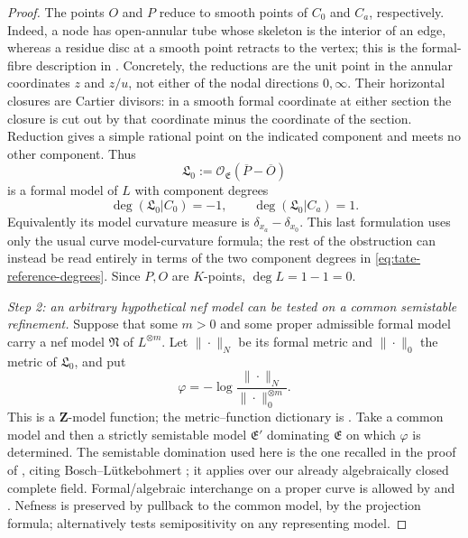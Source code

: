 \begin{proof}
The points $O$ and $P$ reduce to smooth points of $C_0$ and
$C_a$, respectively. Indeed, a node has open-annular tube whose
skeleton is the interior of an edge, whereas a residue disc at a smooth
point retracts to the vertex; this is the formal-fibre description in
\cite[Section 1.3 and Proposition 4.10]{BPR14}. Concretely, the reductions
are the unit point in the annular coordinates $z$ and $z/u$, not
either of the nodal directions $0,\infty$.
Their horizontal closures are Cartier divisors: in a smooth formal
coordinate at either section the closure is cut out by that coordinate
minus the coordinate of the section. Reduction gives a simple
rational point on the indicated component and meets no other component.
Thus
\[
 \mathfrak L_0
   :=\mathcal O_{\mathfrak E}(\overline P-\overline O)
\]
is a formal model of $L$ with component degrees
\begin{equation}
\label{eq:tate-reference-degrees}
 \deg(\mathfrak L_0|C_0)=-1,
 \qquad \deg(\mathfrak L_0|C_a)=1.
\end{equation}
Equivalently its model curvature measure is
$\delta_{x_a}-\delta_{x_0}$.
This last formulation uses only the usual curve model-curvature
formula; the rest of the obstruction can instead be read entirely in
terms of the two component degrees in
\eqref{eq:tate-reference-degrees}.
Since $P,O$ are $K$-points, $\deg L=1-1=0$.

\emph{Step 2: an arbitrary hypothetical nef model can be tested on a
common semistable refinement.}
Suppose that some $m>0$ and some proper admissible formal model
carry a nef model $\mathfrak N$ of $L^{\otimes m}$.
Let $\|\cdot\|_N$ be its formal metric and
$\|\cdot\|_0$ the metric of $\mathfrak L_0$, and put
\[
 \varphi=-\log\frac{\|\cdot\|_N}{\|\cdot\|_0^{\otimes m}}.
\]
This is a $\mathbf Z$-model function; the metric--function dictionary
is \cite[Section 4.7]{GM19}. Take a common model and then a strictly
semistable model $\mathfrak E'$ dominating $\mathfrak E$ on which
$\varphi$ is determined. The semistable domination used here is the
one recalled in the proof of \cite[Proposition 3.7]{GJKM19}, citing
Bosch--L\"utkebohmert \cite[Section 7]{BL85}; it applies over our already
algebraically closed complete field. Formal/algebraic interchange on a
proper curve is allowed by \cite[Theorem 1.1]{GM19} and \cite[Remark 3.3]{GJKM19}.
Nefness is preserved by pullback to the common model, by the projection
formula; alternatively \cite[Proposition 3.5]{GM19} tests semipositivity on
any representing model.


\end{proof}
